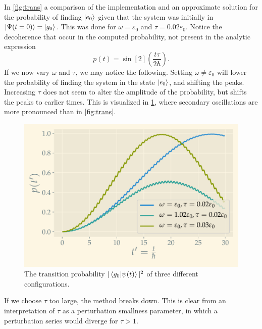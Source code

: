 In \cref{fig:trans} a comparison of the implementation and an approximate solution for the probability of finding $\ket{e_0}$ given that the system was initially in $\ket{\Psi(t=0)} = \ket{g_0}$. This was done for $\omega = \varepsilon_0$ and $\tau = 0.02\varepsilon_0$. Notice the decoherence that occur in the computed probability, not present in the analytic expression\cite{assignment}
\begin{equation} 
p(t) = \sin[2](\frac{t\tau}{2\hbar}).
\end{equation}
If we now vary $\omega$ and $\tau$, we may notice the following. Setting $\omega \ne \varepsilon_0$ will lower the probability of finding the system in the state $\ket{e_0}$, and shifting the peaks. Increasing $\tau$ does not seem to alter the amplitude of the probability, but shifts the peaks to earlier times. This is visualized in \cref{fig:probs}, where secondary oscillations are more pronounced than in \cref{fig:trans}. 
\begin{figure}
	\centering
	\includegraphics[width=\linewidth]{img/stuff.pdf}
	\caption{The transition probability $|\braket{g_0}{\psi(t)}|^2$ of three different configurations. }
	\label{fig:probs}
\end{figure}
If we choose $\tau$ too large, the method breaks down. This is clear from an interpretation of $\tau$ as a perturbation smallness parameter, in which a perturbation series would diverge for  $\tau>1$. 

